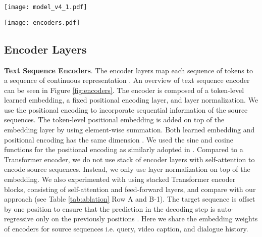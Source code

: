 \documentclass[11pt,a4paper]{article}
\begin{document}
\begin{figure*}[htbp]
	\centering
	\texttt{[image: model\_v4\_1.pdf]}
	\caption{Our MTN architecture includes 3 major components: (i) encoder layers encode text sequences and video features; (ii) decoder layers (D) project target sequence and attend on multiple inputs; and (iii) Query-Aware Auto-Encoder layers (QAE) attend on non-text modalities from query features. For simplicity, Feed Forward, Residual Connection and Layer Normalization layers are not presented. Best viewed in color.}
	\label{fig:model}
\end{figure*}

\begin{figure*}[!htb]
	\centering
	\texttt{[image: encoders.pdf]}
	\caption{2 types of encoders are used: text-sequence encoders (left) and video encoders (right). Text-sequence encoders are used on text input, i.e. dialogue history, video caption, query, and output sequence. Video encoders are used on visual and audio features of input video.}
	\label{fig:encoders}
\end{figure*}

\subsection{Encoder Layers}
\textbf{Text Sequence Encoders}. The encoder layers map each sequence of tokens  to a sequence of continuous representation . An overview of text sequence encoder can be seen in Figure \ref{fig:encoders}. The encoder is composed of a token-level learned embedding, a fixed positional encoding layer, and layer normalization. We use the positional encoding to incorporate sequential information of the source sequences.  The token-level positional embedding is added on top of the embedding layer by using element-wise summation. Both learned embedding and positional encoding has the same dimension . We used the sine and cosine functions for the positional encoding as similarly adopted in \cite{vaswani17attention}. Compared to a Transformer encoder, we do not use stack of encoder layers with self-attention to encode source sequences. Instead, we only use layer normalization \cite{ba2016layer} on top of the embedding. We also experimented with using stacked Transformer encoder blocks, consisting of self-attention and feed-forward layers, and compare with our approach (see Table \ref{tab:ablation} Row A and B-1). The target sequence  is offset by one position to ensure that the prediction in the decoding step  is auto-regressive only on the previously positions . Here we share the embedding weights of encoders for source sequences i.e. query, video caption, and dialogue history. 
\end{document}
